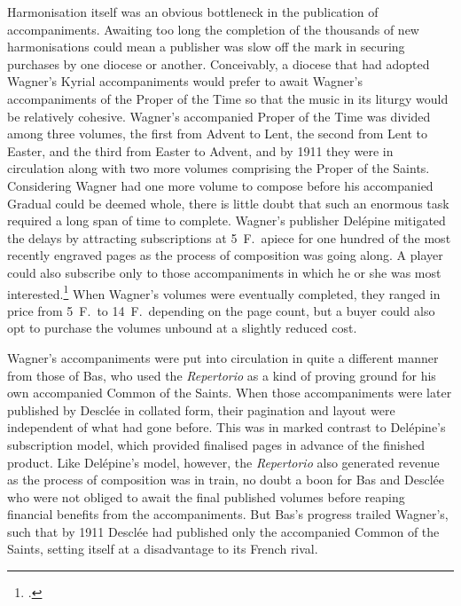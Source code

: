 Harmonisation itself was an obvious bottleneck in the publication of accompaniments.
Awaiting too long the completion of the thousands of new harmonisations could mean a publisher was slow off the mark in securing purchases by one diocese or another.
Conceivably, a diocese that had adopted Wagner's Kyrial accompaniments would prefer to await Wagner's accompaniments of the Proper of the Time so that the music in its liturgy would be relatively cohesive.
Wagner's accompanied Proper of the Time was divided among three volumes, the first from Advent to Lent, the second from Lent to Easter, and the third from Easter to Advent, and by 1911 they were in circulation along with two more volumes comprising the Proper of the Saints.
Considering Wagner had one more volume to compose before his accompanied Gradual could be deemed whole, there is little doubt that such an enormous task required a long span of time to complete.
Wagner's publisher Delépine mitigated the delays by attracting subscriptions at 5~F.\ apiece for one hundred of the most recently engraved pages as the process of composition was going along.
A player could also subscribe only to those accompaniments in which he or she was most interested.\footcite[unpaginated frontmatter bearing the title `Mode de souscription']{WagnerPropriumTemporepremier1908}
When Wagner's volumes were eventually completed, they ranged in price from 5~F.\ to 14~F.\ depending on the page count, but a buyer could also opt to purchase the volumes unbound at a slightly reduced cost.

Wagner's accompaniments were put into circulation in quite a different manner from those of Bas, who used the \emph{Repertorio} as a kind of proving ground for his own accompanied Common of the Saints.
When those accompaniments were later published by Desclée in collated form, their pagination and layout were independent of what had gone before.
This was in marked contrast to Delépine's subscription model, which provided finalised pages in advance of the finished product.
Like Delépine's model, however, the \emph{Repertorio} also generated revenue as the process of composition was in train, no doubt a boon for Bas and Desclée who were not obliged to await the final published volumes before reaping financial benefits from the accompaniments.
But Bas's progress trailed Wagner's, such that by 1911 Desclée had published only the accompanied Common of the Saints, setting itself at a disadvantage to its French rival.

